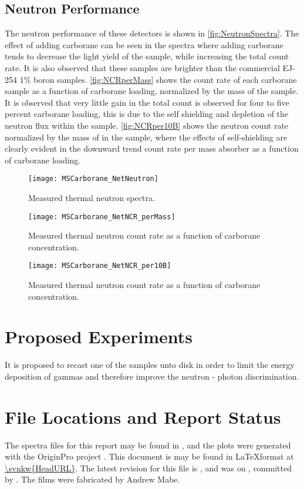 \documentclass[draftcls,onecolumn]{IEEEtran}
\begin{document}
\subsection{Neutron Performance}
The neutron performance of these detectors is shown in \autoref{fig:NeutronSpectra}.
The effect of adding carborane can be seen in the spectra where adding carborane tends to decrease the light yield of the sample, while increasing the total count rate.
It is also observed that these samples are brighter than the commercial EJ-254 1\% boron samples.
\autoref{fig:NCRperMass} shows the count rate of each carborane sample as a function of carborane loading, normalized by the mass of the sample. 
It is observed that very little gain in the total count is observed for four to five percent carborane loading, this is due to the self shielding and depletion of the neutron flux within the sample.
\autoref{fig:NCRper10B} shows the neutron count rate normalized by the mass of  in the sample, where the effects of self-shielding are clearly evident in the downward trend count rate per mass absorber as a function of carborane loading.
\begin{figure}
  \centering
  \texttt{[image: MSCarborane\_NetNeutron]}
  \caption[Measured Thermal Neutron Count Rate]{Measured thermal neutron spectra.}
  \label{fig:NeutronSpectra}
\end{figure}
\begin{figure}
  \centering
  \texttt{[image: MSCarborane\_NetNCR\_perMass]}
  \caption[Measured Thermal Neutron Count Rate]{Measured thermal neutron count rate as a function of carborane concentration. }
  \label{fig:NCRperMass}
\end{figure}
\begin{figure}
  \centering
  \texttt{[image: MSCarborane\_NetNCR\_per10B]}
  \caption[Measured Thermal Neutron Count Rate]{Measured thermal neutron count rate as a function of carborane concentration. }
  \label{fig:NCRper10B}
\end{figure}
\section{Proposed Experiments}
It is proposed to recast one of the samples unto disk in order to limit the energy deposition of gammas and therefore improve the neutron - photon discrimination.
\pagebreak
\appendices
\section{}
\section{File Locations and Report Status}
The spectra files for this report may be found in , and the plots were generated with the OriginPro project .
This document is may be found in \LaTeX format at \url{\svnkw{HeadURL}}.  
The latest revision for this file is \svnrev, and was on \svndate, committed by \svnauthor.
The films were fabricated by Andrew Mabe.
\end{document}
